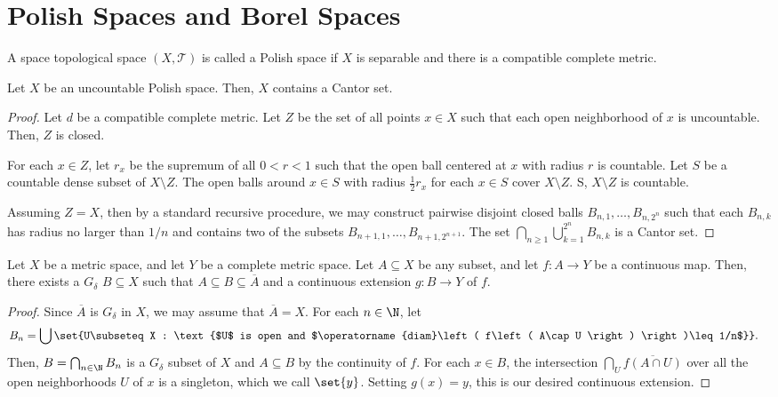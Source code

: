 \documentclass[10pt]{mypackage}
\begin{document}
\RaggedRight
\section{Polish Spaces and Borel Spaces}%
\begin{definition}
  A space topological space $\left( X,\mathcal{T} \right)$ is called a Polish space if $X$ is separable and there is a compatible complete metric.
\end{definition}
\begin{theorem}
  Let $X$ be an uncountable Polish space. Then, $X$ contains a Cantor set.
\end{theorem}
\begin{proof}
  Let $d$ be a compatible complete metric. Let $Z$ be the set of all points $x\in X$ such that each open neighborhood of $x$ is uncountable. Then, $Z$ is closed.

  For each $x\in Z$, let $r_x$ be the supremum of all $0 < r < 1$ such that the open ball centered at $x$ with radius $r$ is countable. Let $S$ be a countable dense subset of $X\setminus Z$. The open balls around $x\in S$ with radius $\frac{1}{2}r_x$ for each $x\in S$ cover $X\setminus Z$. S, $X\setminus Z$ is countable.

  Assuming $Z = X$, then by a standard recursive procedure, we may construct pairwise disjoint closed balls $B_{n,1},\dots,B_{n,2^{n}}$ such that each $B_{n,k}$ has radius no larger than $1/n$ and contains two of the subsets $B_{n+1,1},\dots,B_{n+1,2^{n+1}}$. The set $\bigcap_{n\geq 1}\bigcup_{k=1}^{2^n}B_{n,k}$ is a Cantor set.
\end{proof}
\begin{theorem}
  Let $X$ be a metric space, and let $Y$ be a complete metric space. Let $A\subseteq X$ be any subset, and let $f\colon A\to Y$ be a continuous map. Then, there exists a $G_{\delta}$ $B\subseteq X$ such that $A\subseteq B\subseteq \overline{A}$ and a continuous extension $g\colon B\to Y$ of $f$.
\end{theorem}
\begin{proof}
  Since $ \overline{A} $ is $G_{\delta}$ in $X$, we may assume that $ \overline{A} = X $. For each $n\in \N$, let
  \begin{align*}
    B_n &= \bigcup\set{U\subseteq X : \text{$U$ is open and $\operatorname{diam}\left( f\left( A\cap U \right) \right)\leq 1/n$}}.
  \end{align*}
  Then, $B = \bigcap_{n\in \N}B_n$ is a $G_{\delta}$ subset of $X$ and $A\subseteq B$ by the continuity of $f$. For each $x\in B$, the intersection $\bigcap_{U} \overline{f\left( A\cap U \right)}$ over all the open neighborhoods $U$ of $x$ is a singleton, which we call $\set{y}$. Setting $g(x) = y$, this is our desired continuous extension.
\end{proof}
\end{document}
